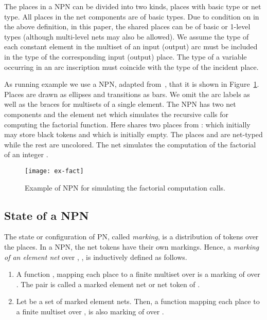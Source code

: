 \documentclass{llncs}
\begin{document}
The places in a NPN can be divided into two kinds, places with basic type or net type. All places in the net components  are of basic types. Due to condition on  in the above definition, in this paper, the shared places can be of basic or 1-level types (although multi-level nets may also be allowed). We assume the type of each constant element in the multiset of an input (output) arc must be included in the type of the corresponding input (output) place. The type of a variable occurring in an arc inscription must coincide with the type of the incident place.




\begin{example}
\label{ex:npn-fact}
As running example we use a NPN, adapted from~\cite{Lomazova01}, that it is shown in Figure~\ref{figRPNFact}. Places are drawn as ellipses and transitions as bars. We omit the arc labels  as well as the braces for multisets of a single element. The NPN has two net components  and the element net  which simulates the recursive calls for computing the factorial function. Here  shares two places from :  which initially may store  black tokens and  which is initially empty. The places  and  are net-typed while the rest are uncolored. The net  simulates the computation of the factorial of an integer .

\vspace{-10pt}
\begin{figure}
\begin{center}
\texttt{[image: ex-fact]}
\end{center}
\vspace{-10pt}
\caption{Example of NPN for simulating the factorial computation calls.}
\label{figRPNFact}
\end{figure}
\end{example}


\subsection{State of a NPN}

The state or configuration of PN, called \emph{marking}, is a distribution of tokens over the places. In a NPN, the net tokens have their own markings. Hence, a \emph{marking of an element net}  over , , is inductively defined as follows.
\begin{enumerate}
    \item A function , mapping each place  to a finite multiset over  is a marking of  over . The pair  is called a marked element net or net token of .
    \item Let  be a set of marked element nets. Then, a function mapping each place  to a finite multiset over , is also marking of  over .
\end{enumerate}
\end{document}
